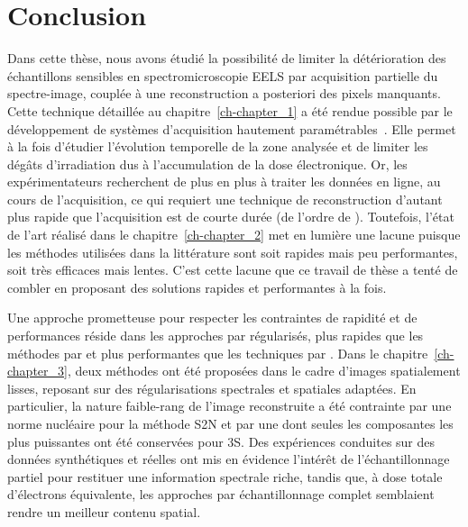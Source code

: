 \chapter*{Conclusion}\label{chap-conclusion}

Dans cette thèse, nous avons étudié la possibilité de limiter la détérioration des échantillons sensibles en spectromicroscopie EELS par acquisition partielle du spectre-image, couplée à une reconstruction a posteriori des pixels manquants. 
%
%
Cette technique détaillée au chapitre~\ref{ch-chapter_1} a été rendue possible par le développement de systèmes d'acquisition hautement paramétrables~\cite{tararan2016random, zobelli2019spatial, tence2019following}. Elle permet à la fois d'étudier l'évolution temporelle de la zone analysée et de limiter les dégâts d'irradiation dus à l'accumulation de la dose électronique.
%
Or, les expérimentateurs recherchent de plus en plus à traiter les données en ligne, \ie{} au cours de l'acquisition, ce qui requiert une technique de reconstruction d'autant plus rapide que l'acquisition est de courte durée (de l'ordre de ). Toutefois, l'état de l'art réalisé dans le chapitre~\ref{ch-chapter_2} met en lumière une lacune puisque les méthodes utilisées dans la littérature sont soit rapides mais peu performantes, soit très efficaces mais lentes. C'est cette lacune que ce travail de thèse a tenté de combler en proposant des solutions rapides et performantes à la fois.

Une approche prometteuse pour respecter les contraintes de rapidité et de performances réside dans les approches par  régularisés, plus rapides que les méthodes par  et plus performantes que les techniques par . Dans le chapitre~\ref{ch-chapter_3}, deux méthodes ont été proposées dans le cadre d'images spatialement lisses, reposant sur des régularisations spectrales et spatiales adaptées. 
%
En particulier, la nature faible-rang de l'image reconstruite a été contrainte par une norme nucléaire pour la méthode S2N et par une  dont seules les composantes les plus puissantes ont été conservées pour 3S.
%
Des expériences conduites sur des données synthétiques et réelles ont mis en évidence l'intérêt de l'échantillonnage partiel pour restituer une information spectrale riche, tandis que, à dose totale d'électrons équivalente, les approches par échantillonnage complet semblaient rendre un meilleur contenu spatial.

